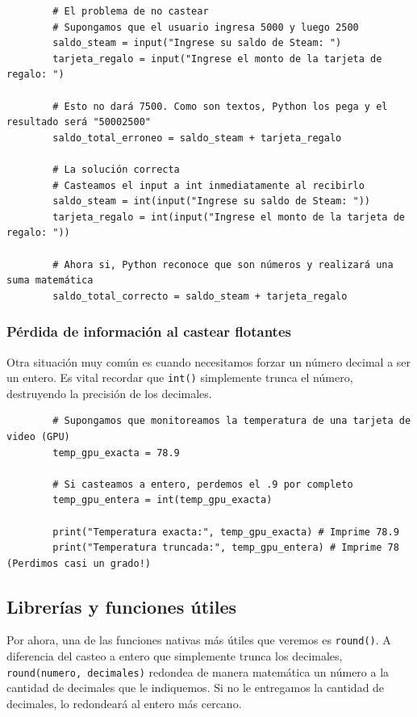 \documentclass[11pt, a4paper]{article}
\begin{document}
	\begin{lstlisting}
		# El problema de no castear
		# Supongamos que el usuario ingresa 5000 y luego 2500
		saldo_steam = input("Ingrese su saldo de Steam: ")
		tarjeta_regalo = input("Ingrese el monto de la tarjeta de regalo: ")
		
		# Esto no dará 7500. Como son textos, Python los pega y el resultado será "50002500"
		saldo_total_erroneo = saldo_steam + tarjeta_regalo 
		
		# La solución correcta
		# Casteamos el input a int inmediatamente al recibirlo
		saldo_steam = int(input("Ingrese su saldo de Steam: "))
		tarjeta_regalo = int(input("Ingrese el monto de la tarjeta de regalo: "))
		
		# Ahora si, Python reconoce que son números y realizará una suma matemática
		saldo_total_correcto = saldo_steam + tarjeta_regalo
	\end{lstlisting}

	\subsubsection*{Pérdida de información al castear flotantes}
	Otra situación muy común es cuando necesitamos forzar un número decimal a ser un entero. Es vital recordar que \texttt{int()} simplemente trunca el número, destruyendo la precisión de los decimales.
	
	\begin{lstlisting}
		# Supongamos que monitoreamos la temperatura de una tarjeta de video (GPU)
		temp_gpu_exacta = 78.9 
		
		# Si casteamos a entero, perdemos el .9 por completo
		temp_gpu_entera = int(temp_gpu_exacta)
		
		print("Temperatura exacta:", temp_gpu_exacta) # Imprime 78.9
		print("Temperatura truncada:", temp_gpu_entera) # Imprime 78 (Perdimos casi un grado!)
	\end{lstlisting}
	
	\subsection{Librerías y funciones útiles}
	
	Por ahora, una de las funciones nativas más útiles que veremos es \texttt{round()}. A diferencia del casteo a entero que simplemente trunca los decimales, \texttt{round(numero, decimales)} redondea de manera matemática un número a la cantidad de decimales que le indiquemos. Si no le entregamos la cantidad de decimales, lo redondeará al entero más cercano.
	
\end{document}
